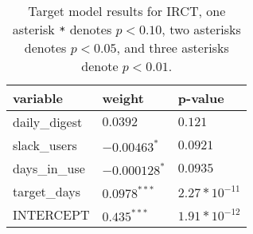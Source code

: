 \renewcommand{\arraystretch}{1.2}
\begin{table}
\begin{center}
\begin{tabular}{|p{4cm}|p{4cm}|p{4cm}|} 
\hline
variable & weight & p-value \\ [0.5ex]
\hline\hline

daily\_digest & $0.0392^{}$ & $0.121$ \\
slack\_users & $-0.00463^{*}$ & $0.0921$ \\
days\_in\_use & $-0.000128^{*}$ & $0.0935$ \\
target\_days & $0.0978^{***}$ & $2.27*10^{-11}$ \\

\hline\hline
INTERCEPT & $0.435^{***}$ & $1.91*10^{-12}$ \\

\hline
\end{tabular}
\caption{Target model results for IRCT, one asterisk \texttt{*} denotes  $p < 0.10$, two asterisks denotes $p < 0.05$, and three asterisks denote $p < 0.01$.}
\label{tab:target-irct-results}
\end{center}
\end{table}